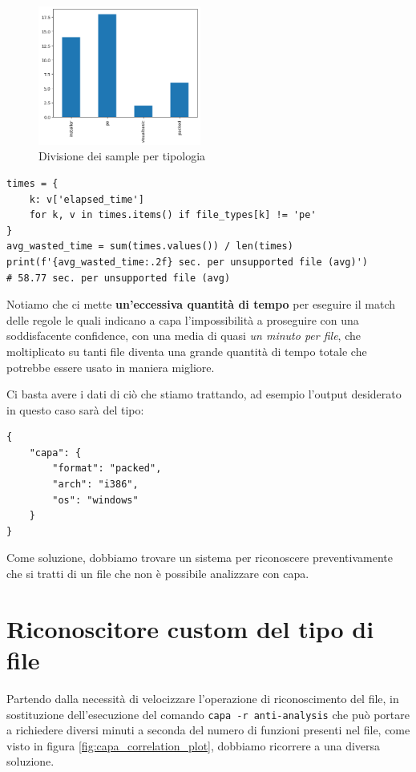 \begin{figure}[!htb]
    \centering
    \includegraphics[height=1.8in]{assets/capa_file_type_split.png}
    \caption{Divisione dei sample per tipologia}
    \label{fig:capa_file_type_split}
\end{figure}

\begin{code}
\caption{Calcolo del tempo sprecato eseguendo capa su file non supportati}
\begin{verbatim}
times = {
    k: v['elapsed_time']
    for k, v in times.items() if file_types[k] != 'pe'
}
avg_wasted_time = sum(times.values()) / len(times)
print(f'{avg_wasted_time:.2f} sec. per unsupported file (avg)')
# 58.77 sec. per unsupported file (avg)
\end{verbatim}
\label{code:static_analysis_capa_count_wasted_time}
\end{code}

Notiamo che ci mette \textbf{un'eccessiva quantità di tempo} per
eseguire il match delle regole le quali indicano a capa l'impossibilità a proseguire con una soddisfacente confidence, con una media di quasi \emph{un minuto per file}, che moltiplicato su tanti file diventa una grande quantità di tempo totale che potrebbe essere usato in maniera migliore.

\medskip

Ci basta avere i dati di ciò che stiamo trattando, ad esempio l'output desiderato in questo caso sarà del tipo:
\begin{verbatim}
{
    "capa": {
        "format": "packed",
        "arch": "i386",
        "os": "windows"
    }
}
\end{verbatim}

Come soluzione, dobbiamo trovare un sistema per riconoscere preventivamente che si tratti di un file che non è possibile analizzare con capa.

\section{Riconoscitore custom del tipo di file}
\label{chap:static_custom_file_detector}
Partendo dalla necessità di velocizzare l'operazione di riconoscimento del file, in sostituzione dell'esecuzione del comando \texttt{capa -r anti-analysis} che può portare a richiedere diversi minuti a seconda del numero di funzioni presenti nel file, come visto in figura \ref{fig:capa_correlation_plot},
dobbiamo ricorrere a una diversa soluzione.

